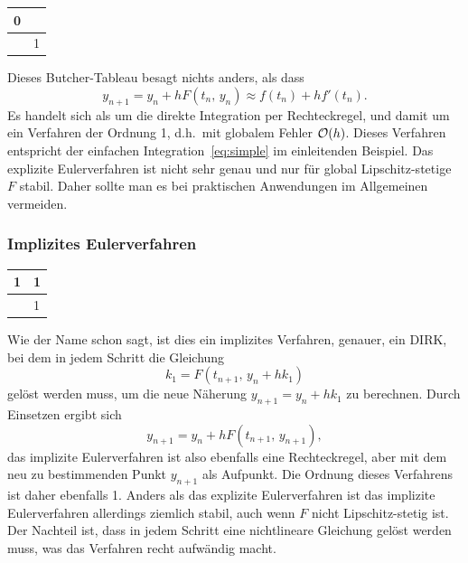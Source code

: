 \begin{center}
  \renewcommand{\arraystretch}{1.3}
  \begin{tabular}{r|l}
    0 & \\\hline
    & 1
  \end{tabular}
\end{center}
Dieses Butcher-Tableau besagt nichts anders, als dass
\begin{equation}
  y_{n+1} = y_n + h F(t_n,\, y_n) \approx f(t_n) + h f'(t_n).
\end{equation}
Es handelt sich als um die direkte Integration per Rechteckregel, und
damit um ein Verfahren der Ordnung 1, d.h.\ mit globalem Fehler
$\mathcal O(h)$. Dieses Verfahren entspricht der einfachen
Integration~\eqref{eq:simple} im einleitenden Beispiel. Das explizite
Eulerverfahren ist nicht sehr genau und nur für global
Lipschitz-stetige $F$ stabil. Daher sollte man es bei praktischen
Anwendungen im Allgemeinen vermeiden.

\subsubsection{Implizites Eulerverfahren}

\begin{center}
  \renewcommand{\arraystretch}{1.3}
  \begin{tabular}{r|l}
    1 & 1\\\hline
    & 1
  \end{tabular}
\end{center}
Wie der Name schon sagt, ist dies ein implizites Verfahren, genauer,
ein DIRK, bei dem in jedem Schritt die Gleichung
\begin{equation}
  k_1 = F(t_{n+1},\,y_n + h k_1)
\end{equation}
gelöst werden muss, um die neue Näherung $y_{n+1} = y_n + h k_1$ zu
berechnen. Durch Einsetzen ergibt sich
\begin{equation}
  y_{n+1} = y_n + h F(t_{n+1},\, y_{n+1}),
\end{equation}
das implizite Eulerverfahren ist also ebenfalls eine Rechteckregel,
aber mit dem neu zu bestimmenden Punkt $y_{n+1}$ als Aufpunkt. Die
Ordnung dieses Verfahrens ist daher ebenfalls 1. Anders als das
explizite Eulerverfahren ist das implizite Eulerverfahren allerdings
ziemlich stabil, auch wenn $F$ nicht Lipschitz-stetig ist. Der
Nachteil ist, dass in jedem Schritt eine nichtlineare Gleichung gelöst
werden muss, was das Verfahren recht aufwändig macht.

